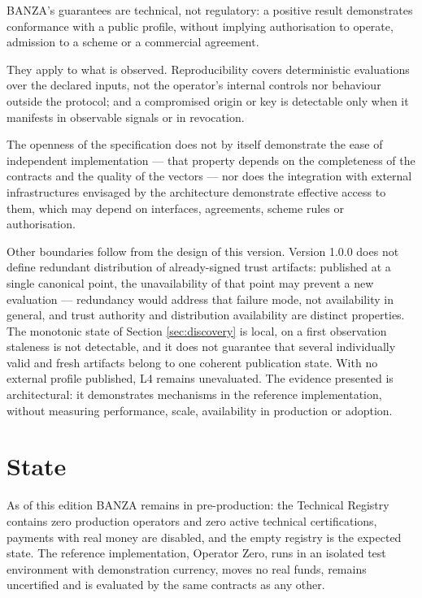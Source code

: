 \documentclass[journal abbreviation, manuscript]{copernicus}
\begin{document}
BANZA's guarantees are technical, not regulatory: a positive result demonstrates conformance with a public profile, without implying authorisation to operate, admission to a scheme or a commercial agreement.

They apply to what is observed. Reproducibility covers deterministic evaluations over the declared inputs, not the operator's internal controls nor behaviour outside the protocol; and a compromised origin or key is detectable only when it manifests in observable signals or in revocation.

The openness of the specification does not by itself demonstrate the ease of independent implementation --- that property depends on the completeness of the contracts and the quality of the vectors --- nor does the integration with external infrastructures envisaged by the architecture demonstrate effective access to them, which may depend on interfaces, agreements, scheme rules or authorisation.

Other boundaries follow from the design of this version. Version 1.0.0 does not define redundant distribution of already-signed trust artifacts: published at a single canonical point, the unavailability of that point may prevent a new evaluation --- redundancy would address that failure mode, not availability in general, and trust authority and distribution availability are distinct properties. The monotonic state of Section \ref{sec:discovery} is local, on a first observation staleness is not detectable, and it does not guarantee that several individually valid and fresh artifacts belong to one coherent publication state. With no external profile published, L4 remains unevaluated. The evidence presented is architectural: it demonstrates mechanisms in the reference implementation, without measuring performance, scale, availability in production or adoption.


\section{State}\label{sec:state}

As of this edition BANZA remains in pre-production: the Technical Registry contains zero production operators and zero active technical certifications, payments with real money are disabled, and the empty registry is the expected state. The reference implementation, Operator Zero, runs in an isolated test environment with demonstration currency, moves no real funds, remains uncertified and is evaluated by the same contracts as any other.
\end{document}
